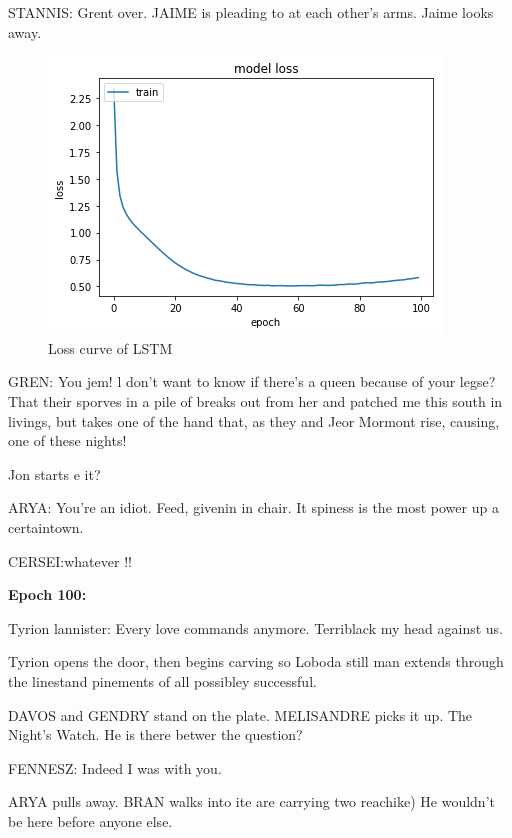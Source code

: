 \documentclass[11pt,a4paper]{article}
\begin{document}
STANNIS: Grent over. JAIME is pleading to at each other’s arms. Jaime looks away.

\begin{figure}[h]
\includegraphics[width=1.0\linewidth]{LSTMLoss.png}
\caption{Loss curve of LSTM}
\end{figure}

GREN: You jem! l don't want to know if there's a queen because of your legse? That their sporves in a pile of breaks out from her and patched me this south in livings, but takes one of the hand that, as they and Jeor Mormont rise, causing, one of these nights!

Jon starts e it?

ARYA: You're an idiot. Feed, givenin in chair. It spiness is the most power up a certaintown.

CERSEI:whatever !!\newline 


\textbf{Epoch 100:}\newline 

Tyrion lannister: Every love commands anymore. Terriblack my head against us.

Tyrion opens the door, then begins carving so Loboda still man extends through the linestand pinements of all possibley successful.

DAVOS and GENDRY stand on the plate. MELISANDRE picks it up. The Night’s Watch. He is there betwer the question?

FENNESZ: Indeed I was with you.

ARYA pulls away. BRAN walks into ite are carrying two reachike) He wouldn't be here before anyone else.
\end{document}
